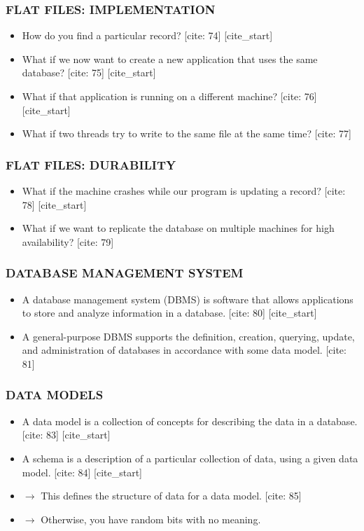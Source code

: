 \documentclass[aspectratio=169]{beamer}
\begin{document}
\begin{frame}
    \frametitle{FLAT FILES: IMPLEMENTATION}
    \begin{itemize}
        [cite_start]\item How do you find a particular record? [cite: 74]
        [cite_start]\item What if we now want to create a new application that uses the same database? [cite: 75]
        [cite_start]\item What if that application is running on a different machine? [cite: 76]
        [cite_start]\item What if two threads try to write to the same file at the same time? [cite: 77]
    \end{itemize}
\end{frame}

\begin{frame}
    \frametitle{FLAT FILES: DURABILITY}
    \begin{itemize}
        [cite_start]\item What if the machine crashes while our program is updating a record? [cite: 78]
        [cite_start]\item What if we want to replicate the database on multiple machines for high availability? [cite: 79]
    \end{itemize}
\end{frame}

\begin{frame}
    \frametitle{DATABASE MANAGEMENT SYSTEM}
    \begin{itemize}
        [cite_start]\item A database management system (DBMS) is software that allows applications to store and analyze information in a database. [cite: 80]
        [cite_start]\item A general-purpose DBMS supports the definition, creation, querying, update, and administration of databases in accordance with some data model. [cite: 81]
    \end{itemize}
\end{frame}

\begin{frame}
    \frametitle{DATA MODELS}
    \begin{itemize}
        [cite_start]\item A data model is a collection of concepts for describing the data in a database. [cite: 83]
        [cite_start]\item A schema is a description of a particular collection of data, using a given data model. [cite: 84]
        [cite_start]\item $\rightarrow$ This defines the structure of data for a data model. [cite: 85]
        \item $\rightarrow$ Otherwise, you have random bits with no meaning.
    \end{itemize}
\end{frame}
\end{document}
